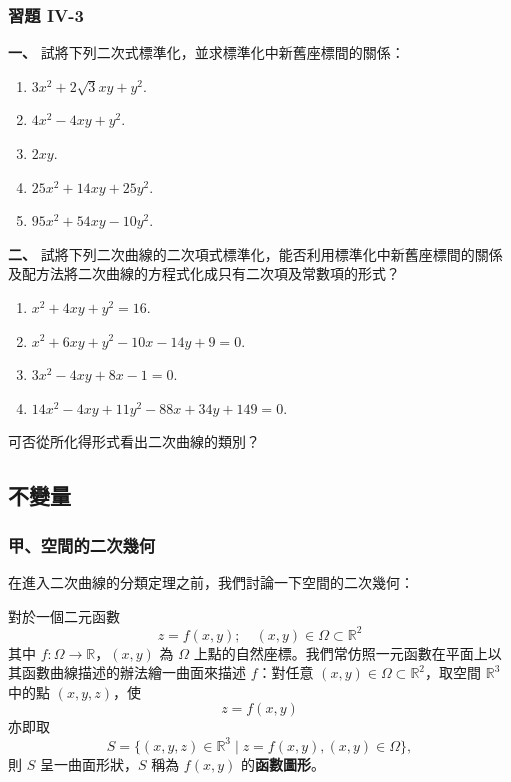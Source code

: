 \subsubsection*{習題 IV-3}

\textbf{一、} 試將下列二次式標準化，並求標準化中新舊座標間的關係：
\begin{enumerate}
  \item $3x^2 + 2\sqrt{3}xy + y^2$.
  \item $4x^2 - 4xy + y^2$.
  \item $2xy$.
  \item $25x^2 + 14xy + 25y^2$.
  \item $95x^2 + 54xy - 10y^2$.
\end{enumerate}

\textbf{二、} 試將下列二次曲線的二次項式標準化，能否利用標準化中新舊座標間的關係及配方法將二次曲線的方程式化成只有二次項及常數項的形式？
\begin{enumerate}
  \item $x^2 + 4xy + y^2 = 16$.
  \item $x^2 + 6xy + y^2 - 10x - 14y + 9 = 0$.
  \item $3x^2 - 4xy + 8x - 1 = 0$.
  \item $14x^2 - 4xy + 11y^2 - 88x + 34y + 149 = 0$.
\end{enumerate}
可否從所化得形式看出二次曲線的類別？


\subsection{不變量}\label{sec:b4s-4-4}

\subsubsection*{甲、\quad 空間的二次幾何}

在進入二次曲線的分類定理之前，我們討論一下空間的二次幾何：

對於一個二元函數
\begin{equation}
z = f(x, y); \quad (x, y) \in \Omega \subset \mathbb{R}^2
\label{eq:b4s-ch4-surface-func}
\end{equation}
其中 $f: \Omega \to \mathbb{R}$，$(x, y)$ 為 $\Omega$ 上點的自然座標。我們常仿照一元函數在平面上以其函數曲線描述的辦法繪一曲面來描述 $f$：對任意 $(x, y) \in \Omega \subset \mathbb{R}^2$，取空間 $\mathbb{R}^3$ 中的點 $(x, y, z)$，使
\[
z = f(x, y)
\]
亦即取
\[
S = \{ (x, y, z) \in \mathbb{R}^3 \mid z = f(x, y), (x, y) \in \Omega \},
\]
則 $S$ 呈一曲面形狀，$S$ 稱為 $f(x, y)$ 的\textbf{函數圖形}。

